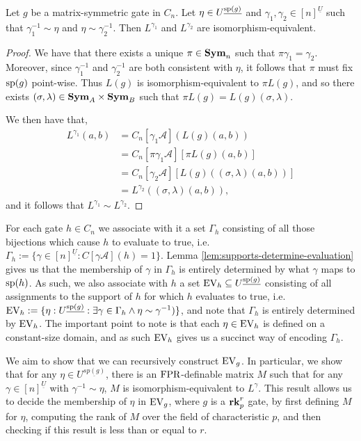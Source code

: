 \documentclass[../paper.tex]{subfiles}
\begin{document}
\begin{lem}
  Let $g$ be a matrix-symmetric gate in $C_n$. Let $\eta \in
  U^{\underline{\text{sp}(g)}}$ and $\gamma_1, \gamma_2 \in [n]^{\underline{U}}$
  such that $\gamma^{-1}_1 \sim \eta$ and $\eta \sim \gamma^{-1}_2$. Then
  $L^{\gamma_1}$ and $L^{\gamma_2}$ are isomorphism-equivalent.
  \label{lem:support-determines-evaluation}
\end{lem}

\begin{proof}
  We have that there exists a unique $\pi \in \text{\textbf{Sym}}_n$ such that $\pi \gamma_1 =
  \gamma_2$. Moreover, since $\gamma^{-1}_1$ and $\gamma^{-1}_2$ are both
  consistent with $\eta$, it follows that $\pi$ must fix $\text{sp}(g)$ point-wise.
  Thus $L(g)$ is isomorphism-equivalent to $\pi L(g)$, and so there exists
  $(\sigma, \lambda) \in \text{\textbf{Sym}}_A \times \text{\textbf{Sym}}_B$ such that $\pi L(g) = L(g)
  (\sigma, \lambda)$.

  We then have that,
  \begin{align*}
    L^{\gamma_1} (a,b) &= C_n[\gamma_1 \mathcal{A}](L(g)(a,b))\\
                       & = C_n[\pi \gamma_1 \mathcal{A}][\pi L(g)(a,b)] \\
                       & = C_n[\gamma_2 \mathcal{A}][L(g)((\sigma, \lambda)(a,b))]\\
                       & = L^{\gamma_2} ((\sigma, \lambda) (a,b)),
  \end{align*}
  and it follows that $L^{\gamma_1} \sim L^{\gamma_2}$.
\end{proof}

For each gate $h \in C_n$ we associate with it a set $\Gamma_h$ consisting of
all those bijections which cause $h$ to evaluate to true, i.e. $\Gamma_h:=
\{\gamma \in [n]^{\underline{U}} : C[\gamma \mathcal{A}](h) = 1 \}$. Lemma
\ref{lem:supports-determine-evaluation} gives us that the membership of $\gamma$
in $\Gamma_h$ is entirely determined by what $\gamma$ maps to $\text{sp}(h)$. As
such, we also associate with $h$ a set $\text{EV}_h \subseteq
U^{\underline{\text{sp}(g)}}$ consisting of all assignments to the support of $h$
for which $h$ evaluates to true, i.e. $\text{EV}_h := \{ \eta:
U^{\underline{\text{sp}(g)}} : \exists \gamma \in \Gamma_h \wedge \eta \sim
\gamma^{-1})\}$, and note that $\Gamma_h$ is entirely determined by $\text{EV}_h$. The
important point to note is that each $\eta \in \text{EV}_h$ is defined on a
constant-size domain, and as such $\text{EV}_h$ gives us a succinct way of encoding
$\Gamma_h$.

We aim to show that we can recursively construct $\text{EV}_g$. In particular, we show
that for any $\eta \in U^{\underline{sp(g)}}$, there is an $\text{\upshape FPR}$-definable
matrix $M$ such that for any $\gamma \in [n]^{\underline{U}}$ with $\gamma^{-1}
\sim \eta$, $M$ is isomorphism-equivalent to $L^{\gamma}$. This result allows us
to decide the membership of $\eta$ in $\text{EV}_g$, where $g$ is a $\text{\textbf{rk}}^r_p$ gate,
by first defining $M$ for $\eta$, computing the rank of $M$ over the field of
characteristic $p$, and then checking if this result is less than or equal to
$r$.
\end{document}
